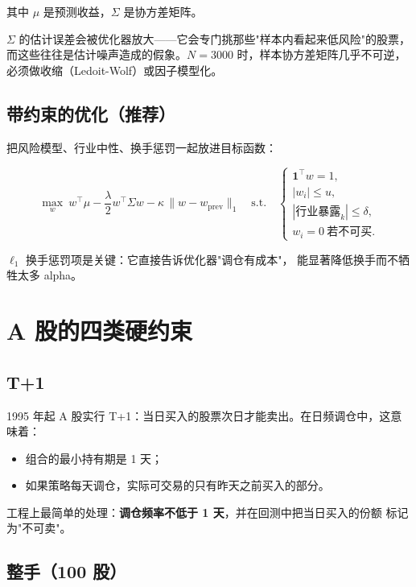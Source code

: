其中 $\mu$ 是预测收益，$\Sigma$ 是协方差矩阵。

\begin{warnbox}[均值--方差在股票池上的经典失败]
$\Sigma$ 的估计误差会被优化器放大——它会专门挑那些"样本内看起来低风险"的股票，
而这些往往是估计噪声造成的假象。$N=3000$ 时，样本协方差矩阵几乎不可逆，
必须做收缩（Ledoit-Wolf）或因子模型化。
\end{warnbox}

\subsection{带约束的优化（推荐）}

把风险模型、行业中性、换手惩罚一起放进目标函数：

\begin{equation}
  \max_{w}\ w^\top \mu
  - \frac{\lambda}{2}w^\top \Sigma w
  - \kappa\,\|w - w_{\text{prev}}\|_1
  \quad \text{s.t.}\quad
  \begin{cases}
    \mathbf{1}^\top w = 1, \\
    |w_i| \le u, \\
    |\text{行业暴露}_k| \le \delta, \\
    w_i = 0 \ \text{若不可买}.
  \end{cases}
\end{equation}

$\ell_1$ 换手惩罚项是关键：它直接告诉优化器"调仓有成本"，
能显著降低换手而不牺牲太多 alpha。

\section{A 股的四类硬约束}

\subsection{T+1}

1995 年起 A 股实行 T+1：当日买入的股票次日才能卖出。在日频调仓中，这意味着：
\begin{itemize}
  \item 组合的最小持有期是 1 天；
  \item 如果策略每天调仓，实际可交易的只有昨天之前买入的部分。
\end{itemize}

工程上最简单的处理：\textbf{调仓频率不低于 1 天}，并在回测中把当日买入的份额
标记为"不可卖"。

\subsection{整手（100 股）}

